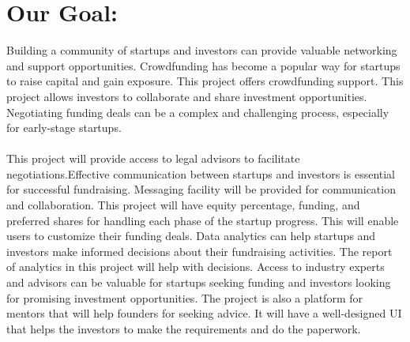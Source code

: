 \section{Our Goal: }
Building a community of startups and investors can provide valuable networking and support opportunities. Crowdfunding has become a popular way for startups to raise capital and gain exposure. This project offers crowdfunding support. This project allows investors to collaborate and share investment opportunities. Negotiating funding deals can be a complex and challenging process, especially for early-stage startups. 
\\\\
This project will provide access to legal advisors to facilitate negotiations.Effective communication between startups and investors is essential for successful fundraising. Messaging facility will be provided for communication and collaboration. This project will have equity percentage, funding, and preferred shares for handling each phase of the startup progress. This will enable users to customize their funding deals. Data analytics can help startups and investors make informed decisions about their fundraising activities. The report of analytics in this project will help with decisions. Access to industry experts and advisors can be valuable for startups seeking funding and investors looking for promising investment opportunities. The project is also a platform for mentors that will help founders for seeking advice. It will have a well-designed UI that helps the investors to make the requirements and do the paperwork.




